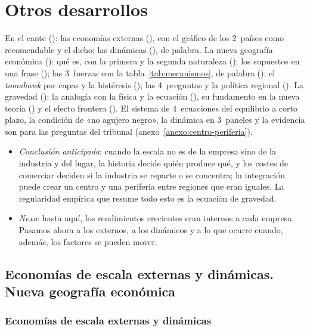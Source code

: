 \documentclass[11pt]{article}
\begin{document}
\section{Otros desarrollos}\label{sec:otros-desarrollos}

\begin{notaopositor}
En el cante (): las economías externas (), con el gráfico de los 2~países como recomendable y el dicho; las dinámicas (), de palabra. La nueva geografía económica (): qué es, con la primera y la segunda naturaleza (); los supuestos en una frase (); las 3~fuerzas con la tabla~\ref{tab:mecanismos}, de palabra (); el \emph{tomahawk} por capas y la histéresis (); las 4~preguntas y la política regional (). La gravedad (): la analogía con la física y la ecuación (), su fundamento en la nueva teoría () y el efecto frontera (). El sistema de 4~ecuaciones del equilibrio a corto plazo, la condición de «no agujero negro», la dinámica en 3~paneles y la evidencia son para las preguntas del tribunal (anexo~\ref{anexo:centro-periferia}).
\end{notaopositor}

\begin{itemize}
\item \emph{Conclusión anticipada}: cuando la escala no es de la empresa sino de la industria y del lugar, la historia decide quién produce qué, y los costes de comerciar deciden si la industria se reparte o se concentra; la integración puede crear un centro y una periferia entre regiones que eran iguales. La regularidad empírica que resume todo esto es la ecuación de gravedad.
\item \emph{Nexo}: hasta aquí, los rendimientos crecientes eran internos a cada empresa. Pasamos ahora a los externos, a los dinámicos y a lo que ocurre cuando, además, los factores se pueden mover.
\end{itemize}

\subsection{Economías de escala externas y dinámicas. Nueva geografía económica}\label{sec:externas-neg}

\subsubsection{Economías de escala externas y dinámicas}\label{sec:economias-externas}
\end{document}
